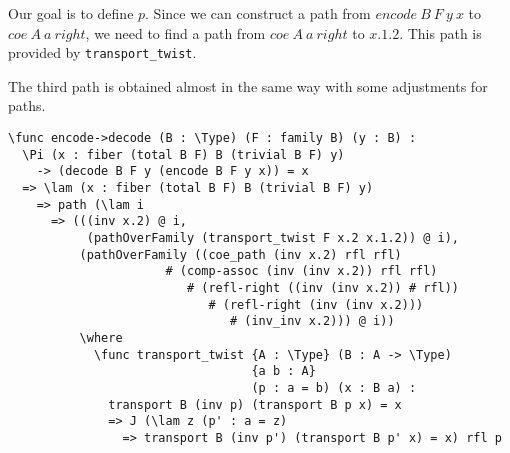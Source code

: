 \begin{figure}[H]
\centering
{}
\caption{}
\label{fig:2}
\end{figure}

Our goal is to define $p$. Since we can construct a path from $encode\ B\ F\ y\ x$ to $coe\ A\ a\ right$, we need to find a path from $coe\ A\ a\ right$ to $x.1.2$. This path is provided by \texttt{transport\_twist}.

The third path is obtained almost in the same way with some adjustments for paths.

\begin{ListingEnv}[H]
\begin{lstlisting}
\func encode->decode (B : \Type) (F : family B) (y : B) :
  \Pi (x : fiber (total B F) B (trivial B F) y)
    -> (decode B F y (encode B F y x)) = x
  => \lam (x : fiber (total B F) B (trivial B F) y)
    => path (\lam i
      => (((inv x.2) @ i,
           (pathOverFamily (transport_twist F x.2 x.1.2)) @ i),
          (pathOverFamily ((coe_path (inv x.2) rfl rfl)
                      # (comp-assoc (inv (inv x.2)) rfl rfl)
                         # (refl-right ((inv (inv x.2)) # rfl))
                            # (refl-right (inv (inv x.2)))
                               # (inv_inv x.2))) @ i))
          \where
            \func transport_twist {A : \Type} (B : A -> \Type)
                                  {a b : A}
                                  (p : a = b) (x : B a) :
              transport B (inv p) (transport B p x) = x
              => J (\lam z (p' : a = z)
                => transport B (inv p') (transport B p' x) = x) rfl p
\end{lstlisting}
\end{ListingEnv}

